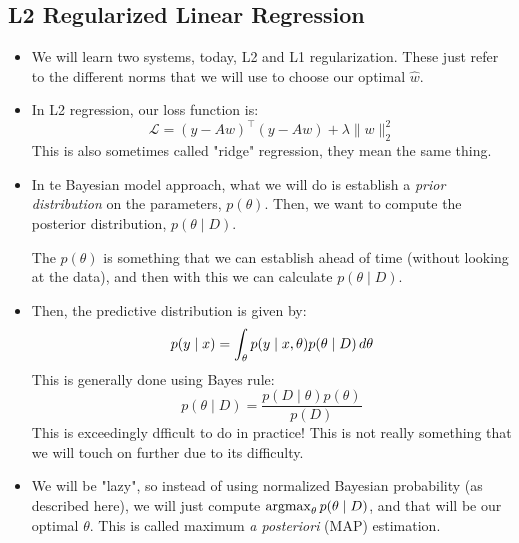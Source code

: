 \subsection{L2 Regularized Linear Regression} 
\begin{itemize}
	\item We will learn two systems, today, L2 and L1 regularization. These just
		refer to the different norms that we will use to choose our optimal \(
		\hat{w} \). 
	\item In L2 regression, our loss function is:
		\[
			\mathcal{L} = (y - Aw)^{\top}(y - Aw) + \lambda \|w\|_2^2
		\]
		This is also sometimes called "ridge" regression, they mean the same thing. 
	\item In te Bayesian model approach, what we will do is establish a \textit{prior
		distribution} on the parameters, \( p(\theta)  \). Then, we want to compute
		the posterior distribution, \( p(\theta \mid D) \). 

		The \( p(\theta) \) is something that we can establish ahead of time (without
		looking at the data), and then with this we can calculate \( p(\theta \mid D)
		\). 
	\item Then, the predictive distribution is given by:
		\[
			p(y \mid x) = \int_\theta p(y\mid x, \theta) p(\theta \mid D) \,d \theta
		\]
		This is generally done using Bayes rule:
		\[
			p(\theta \mid D) = \frac{p(D \mid \theta) p(\theta)}{p(D)}
		\]
		This is exceedingly dfficult to do in practice! This is not really something
		that we will touch on further due to its difficulty. 
	\item We will be "lazy", so instead of using normalized Bayesian probability (as
		described here), we will just compute \( \operatorname*{argmax}_\theta p(\theta \mid D) \),
		and that will be our optimal \( \theta \). This is called maximum \textit{a
		posteriori} (MAP) estimation.  

\end{itemize}
